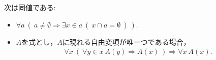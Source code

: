	\begin{screen}
		\begin{thm}\label{thm:equivalent_condition_of_axiom_of_regularity}
			次は同値である:
			\begin{itemize}
				\item $\forall a\ \left(\ a \neq \emptyset \Longrightarrow 
					\exists x \in a\ (\ x \cap a = \emptyset\ )\ \right)$.
				
				\item $A$を式とし，$A$に現れる自由変項が唯一つである場合，
					\begin{align}
						\forall x\ \left(\ \forall y \in x\ A(y)
						\Longrightarrow A(x)\ \right)
						\Longrightarrow \forall x\ A(x).
					\end{align}
			\end{itemize}
		\end{thm}
	\end{screen}
	
